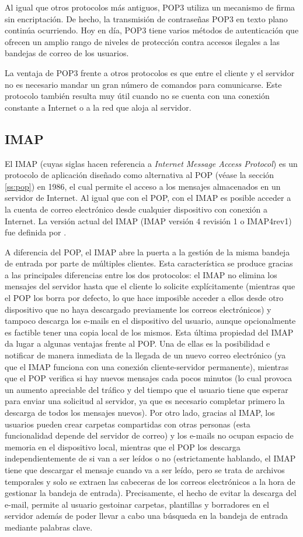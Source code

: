 Al igual que otros protocolos más antiguos, POP3 utiliza un mecanismo de firma sin encriptación. De hecho, la transmisión de contraseñas POP3 en texto plano continúa ocurriendo. Hoy en día, POP3 tiene varios métodos de autenticación que ofrecen un amplio rango de niveles de protección contra accesos ilegales a las bandejas de correo de los usuarios.

La ventaja de POP3 frente a otros protocolos es que entre el cliente y el servidor no es necesario mandar un gran número de comandos para comunicarse. Este protocolo también resulta muy útil cuando no se cuenta con una conexión constante a Internet o a la red que aloja al servidor.

\subsection{IMAP}\label{ss:imap}
El IMAP (cuyas siglas hacen referencia a \textit{Internet Message Access Protocol}) es un protocolo de aplicación diseñado como alternativa al POP (véase la sección \ref{ss:pop}) en 1986, el cual permite el acceso a los mensajes almacenados en un servidor de Internet. Al igual que con el POP, con el IMAP es posible acceder a la cuenta de correo electrónico desde cualquier dispositivo con conexión a Internet. La versión actual del IMAP (IMAP versión 4 revisión 1 o IMAP4rev1) fue definida por \cite{rfc3501}.

A diferencia del POP, el IMAP abre la puerta a la gestión de la misma bandeja de entrada por parte de múltiples clientes. Esta característica se produce gracias a las principales diferencias entre los dos protocolos: el IMAP no elimina los mensajes del servidor hasta que el cliente lo solicite explícitamente (mientras que el POP los borra por defecto, lo que hace imposible acceder a ellos desde otro dispositivo que no haya descargado previamente los correos electrónicos) y tampoco descarga los e-mails en el dispositivo del usuario, aunque opcionalmente es factible tener una copia local de los mismos. Esta última propiedad del IMAP da lugar a algunas ventajas frente al POP. Una de ellas es la posibilidad e notificar de manera inmediata de la llegada de un nuevo correo electrónico (ya que el IMAP funciona con una conexión cliente-servidor permanente), mientras que el POP verifica si hay nuevos mensajes cada pocos minutos (lo cual provoca un aumento apreciable del tráfico y del tiempo que el usuario tiene que esperar para enviar una solicitud al servidor, ya que es necesario completar primero la descarga de todos los mensajes nuevos). Por otro lado, gracias al IMAP, los usuarios pueden crear carpetas compartidas con otras personas (esta funcionalidad depende del servidor de correo) y los e-mails no ocupan espacio de memoria en el dispositivo local, mientras que el POP los descarga independientemente de si van a ser leídos o no (estrictamente hablando, el IMAP tiene que descargar el mensaje cuando va a ser leído, pero se trata de archivos temporales y solo se extraen las cabeceras de los correos electrónicos a la hora de gestionar la bandeja de entrada). Precisamente, el hecho de evitar la descarga del e-mail, permite al usuario gestoinar carpetas, plantillas y borradores en el servidor además de poder llevar a cabo una búsqueda en la bandeja de entrada mediante palabras clave.
